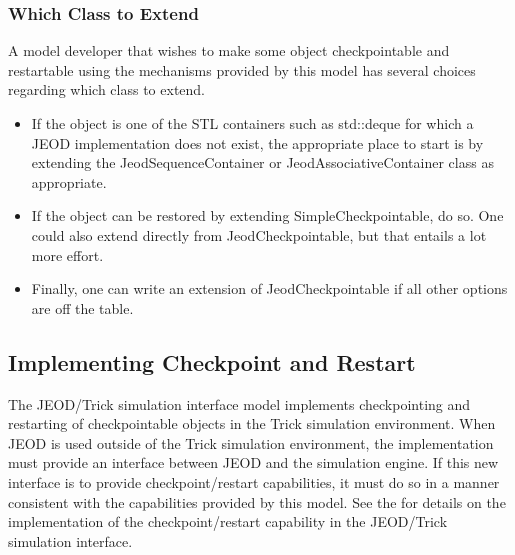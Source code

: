 \subsubsection{Which Class to Extend}
A model developer that wishes to make some object checkpointable and
restartable using the mechanisms provided by this model has several choices
regarding which class to extend.\begin{itemize}
\item If the object is one of the STL containers such as std::deque for which a
JEOD implementation does not exist, the appropriate place to start is by
extending the JeodSequenceContainer or JeodAssociativeContainer class
as appropriate.
\item If the object can be restored by extending SimpleCheckpointable,
do so. One could also extend directly from JeodCheckpointable, but that entails
a lot more effort.
\item Finally, one can write an extension of JeodCheckpointable if
all other options are off the table.
\end{itemize}

\subsection{Implementing Checkpoint and Restart}
The JEOD/Trick simulation interface model implements checkpointing and
restarting of checkpointable objects in the Trick simulation environment.
When JEOD is used outside of the Trick simulation environment, the
implementation must provide an interface between JEOD and the simulation
engine. If this new interface is to provide checkpoint/restart capabilities,
it must do so in a manner consistent with the capabilities provided by
this model. See the  for details on the
implementation of the checkpoint/restart capability in the
 JEOD/Trick simulation interface.

